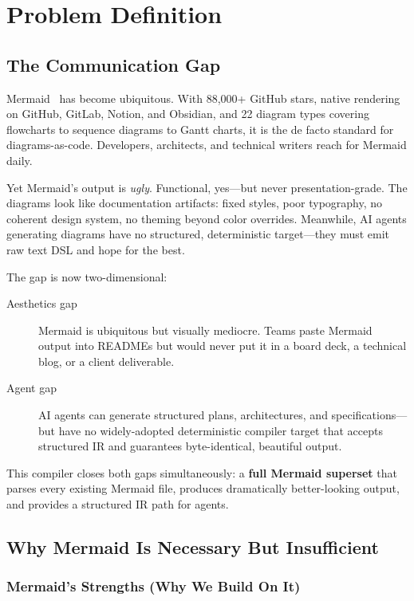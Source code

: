 \section{Problem Definition}
\label{sec:problem}

\subsection{The Communication Gap}

Mermaid~\cite{mermaid2023} has become ubiquitous. With 88{,}000+ GitHub stars, native rendering on GitHub, GitLab, Notion, and Obsidian, and 22 diagram types covering flowcharts to sequence diagrams to Gantt charts, it is the de facto standard for diagrams-as-code. Developers, architects, and technical writers reach for Mermaid daily.

Yet Mermaid's output is \emph{ugly}. Functional, yes---but never presentation-grade. The diagrams look like documentation artifacts: fixed styles, poor typography, no coherent design system, no theming beyond color overrides. Meanwhile, AI agents generating diagrams have no structured, deterministic target---they must emit raw text DSL and hope for the best.

The gap is now two-dimensional:

\begin{description}
  \item[Aesthetics gap] Mermaid is ubiquitous but visually mediocre. Teams paste Mermaid output into READMEs but would never put it in a board deck, a technical blog, or a client deliverable.
  
  \item[Agent gap] AI agents can generate structured plans, architectures, and specifications---but have no widely-adopted deterministic compiler target that accepts structured IR and guarantees byte-identical, beautiful output.
\end{description}

This compiler closes both gaps simultaneously: a \textbf{full Mermaid superset} that parses every existing Mermaid file, produces dramatically better-looking output, and provides a structured IR path for agents.

\subsection{Why Mermaid Is Necessary But Insufficient}

\subsubsection{Mermaid's Strengths (Why We Build On It)}

